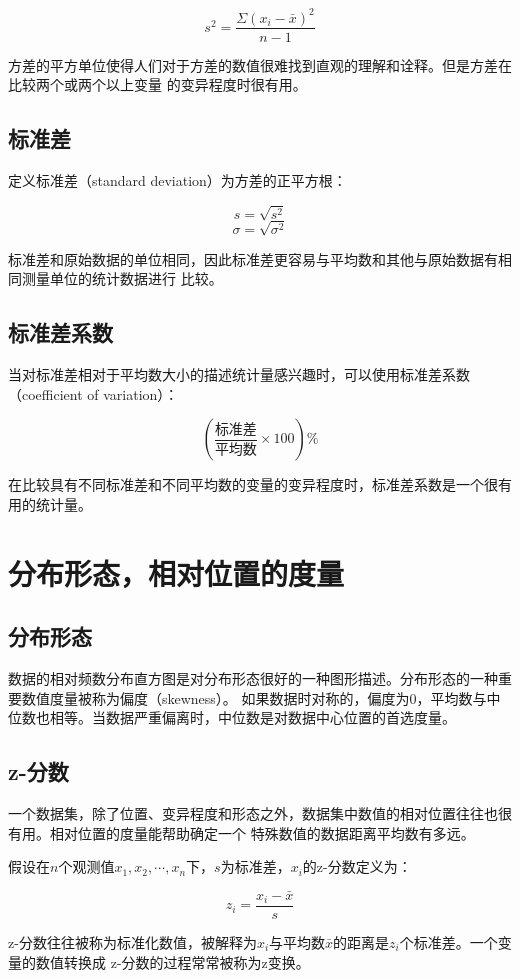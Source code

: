 \documentclass[a4paper]{ctexrep}
\begin{document}
\[s^{2} = \frac{\Sigma(x_{i} - \bar{x})^{2}}{n - 1}\]

方差的平方单位使得人们对于方差的数值很难找到直观的理解和诠释。但是方差在比较两个或两个以上变量
的变异程度时很有用。

\subsection{标准差}
定义标准差（standard deviation）为方差的正平方根：

\[s = \sqrt{s^{2}}\]
\[\sigma = \sqrt{\sigma^{2}}\]

标准差和原始数据的单位相同，因此标准差更容易与平均数和其他与原始数据有相同测量单位的统计数据进行
比较。

\subsection{标准差系数}
当对标准差相对于平均数大小的描述统计量感兴趣时，可以使用标准差系数（coefficient of variation）：

\[(\frac{\mbox{标准差}}{\mbox{平均数}}\times 100)\%\]

在比较具有不同标准差和不同平均数的变量的变异程度时，标准差系数是一个很有用的统计量。


\section{分布形态，相对位置的度量}

\subsection{分布形态}
数据的相对频数分布直方图是对分布形态很好的一种图形描述。分布形态的一种重要数值度量被称为偏度（skewness）。
如果数据时对称的，偏度为0，平均数与中位数也相等。当数据严重偏离时，中位数是对数据中心位置的首选度量。

\subsection{z-分数}
一个数据集，除了位置、变异程度和形态之外，数据集中数值的相对位置往往也很有用。相对位置的度量能帮助确定一个
特殊数值的数据距离平均数有多远。

假设在$n$个观测值$x_{1}, x_{2}, \cdots, x_{n}$下，$s$为标准差，$x_{i}$的z-分数定义为：

\[z_{i}=\frac{x_{i}-\bar{x}}{s}\]

z-分数往往被称为标准化数值，被解释为$x_{i}$与平均数$\bar{x}$的距离是$z_{i}$个标准差。一个变量的数值转换成
z-分数的过程常常被称为z变换。
\end{document}
